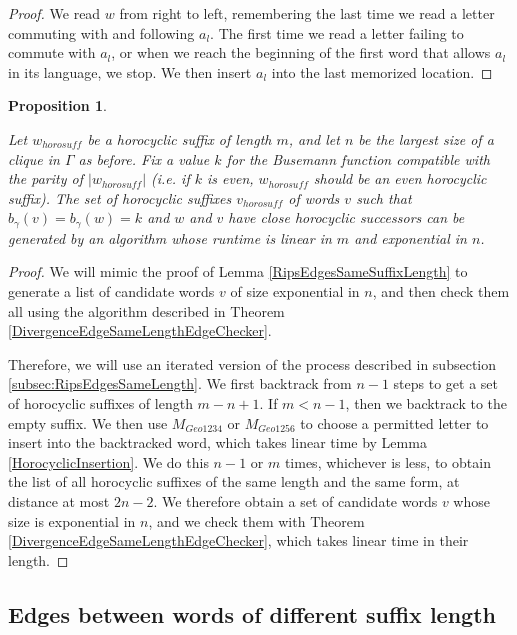 \documentclass[10pt,a4paper]{amsart}
\newtheorem{proposition}[theorem]{Proposition}
\theoremstyle{definition}
\theoremstyle{remark}
\begin{document}
	\begin{proof}
		
		We read $w$ from right to left, remembering the last time we read a letter commuting with and following $a_l$. The first time we read a letter failing to commute with $a_l$, or when we reach the beginning of the first word that allows $a_l$ in its language, we stop. We then insert $a_l$ into the last memorized location.	
	\end{proof}
	
	\begin{proposition} \label{DivergenceGraphSameSuffixLengthEdgeGenerator}
		
		Let $w_{horosuff}$ be a horocyclic suffix of length $m$, and let $n$ be the largest size of a clique in $\Gamma$ as before. Fix a value $k$ for the Busemann function compatible with the parity of $|w_{horosuff}|$ (i.e. if $k$ is even, $w_{horosuff}$ should be an even horocyclic suffix). The set of horocyclic suffixes $v_{horosuff}$ of words $v$ such that $b_\gamma(v)=b_\gamma(w)=k$ and $w$ and $v$ have close horocyclic successors can be generated by an algorithm whose runtime is linear in $m$ and exponential in $n$.
	\end{proposition}
	
	\begin{proof}
		
		We will mimic the proof of Lemma \ref{RipsEdgesSameSuffixLength} to generate a list of candidate words $v$ of size exponential in $n$, and then check them all using the algorithm described in Theorem \ref{DivergenceEdgeSameLengthEdgeChecker}.
		
		Therefore, we will use an iterated version of the process described in subsection \ref{subsec:RipsEdgesSameLength}. We first backtrack from $n-1$ steps to get a set of horocyclic suffixes of length $m-n+1$. If $m<n-1$, then we backtrack to the empty suffix. We then use $M_{Geo1234}$ or $M_{Geo1256}$ to choose a permitted letter to insert into the backtracked word, which takes linear time by Lemma \ref{HorocyclicInsertion}. We do this $n-1$ or $m$ times, whichever is less, to obtain the list of all horocyclic suffixes of the same length and the same form, at distance at most $2n-2$. We therefore obtain a set of candidate words $v$ whose size is exponential in $n$, and we check them with Theorem \ref{DivergenceEdgeSameLengthEdgeChecker}, which takes linear time in their length.
	\end{proof}
	
	
	\subsection{Edges between words of different suffix length}
	\label{subsec:DivergenceEdgesDifferenLength}
	
\end{document}
